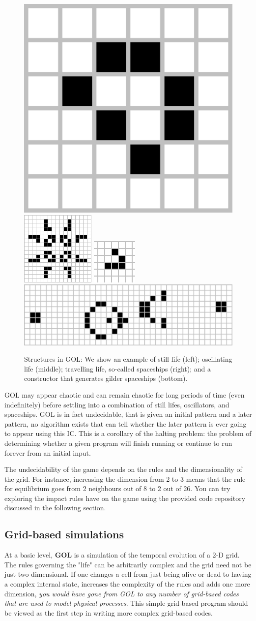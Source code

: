 \begin{figure}[!h]	
	\centering
	\includegraphics[height=0.06\textwidth, valign=c]{figs/Game_of_life_loaf.png}
	\includegraphics[height=0.17\textwidth, valign=c]{figs/Game_of_life_pulsar.png}
	\includegraphics[height=0.06\textwidth, valign=c]{figs/Game_of_life_animated_glider.png}
    \includegraphics[height=0.11\textwidth, valign=c]{figs/Game_of_life_glider_gun.svg.png}
	\caption{Structures in GOL: We show an example of still life (left); oscillating life (middle); travelling life, so-called spaceships (right); and a constructor that generates gilder spaceships (bottom).}
	\label{fig:gol-structures}
\end{figure}

GOL may appear chaotic and can remain chaotic for long periods of time (even indefinitely) before settling into a combination of still lifes, oscillators, and spaceships. GOL is in fact undecidable, that is given an initial pattern and a later pattern, no algorithm exists that can tell whether the later pattern is ever going to appear using this IC. This is a corollary of the halting problem: the problem of determining whether a given program will finish running or continue to run forever from an initial input. 
\par 
The undecidability of the game depends on the rules and the dimensionality of the grid. For instance, increasing the dimension from 2 to 3 means that the rule for equilibrium goes from 2 neighbours out of 8 to 2 out of 26. You can try exploring the impact rules have on the game using the provided code repository discussed in the following section. 

\subsection{Grid-based simulations}
\label{sec:gol:gridsims}
At a basic level, \textbf{GOL} is a simulation of the temporal evolution of a 2-D grid. The rules governing the "life" can be arbitrarily complex and the grid need not be just two dimensional. If one changes a cell from just being alive or dead to having a complex internal state, increases the complexity of the rules and adds one more dimension,  \textit{you would have gone from GOL to any number of grid-based codes that are used to model physical processes}. This simple grid-based program should be viewed as the first step in writing more complex grid-based codes. 


